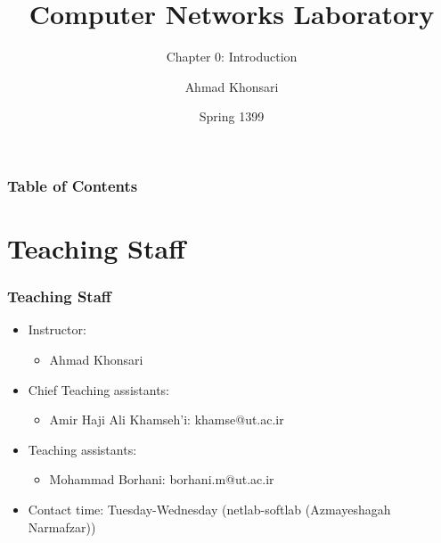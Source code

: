 \documentclass[aspectratio=169,15pt]{beamer}
\title{Computer Networks Laboratory}
\subtitle{Chapter 0: Introduction}
\author{Ahmad Khonsari}
\institute[ECE @ UT]{
    ECE Department\\
    Tehran University \newline
    \url{http://ece.ut.ac.ir/portal/}
}
\date{Spring 1399}
\begin{document}
\frame{\titlepage}


\begin{frame}
    \frametitle{Table of Contents}
    \tableofcontents
\end{frame}

\section{Teaching Staff}
\begin{frame}
\frametitle{Teaching Staff}
\begin{itemize}
    \item Instructor:
    \begin{itemize}
        \item Ahmad Khonsari
    \end{itemize}
    \item Chief Teaching assistants:
    \begin{itemize}
        \item Amir Haji Ali Khamseh’i: khamse@ut.ac.ir
    \end{itemize}
    \item Teaching assistants:
    \begin{itemize}
        \item Mohammad Borhani: borhani.m@ut.ac.ir
    \end{itemize}
    \item Contact time: Tuesday-Wednesday (netlab-softlab (Azmayeshagah Narmafzar))
\end{itemize}

\end{frame}
\end{document}
